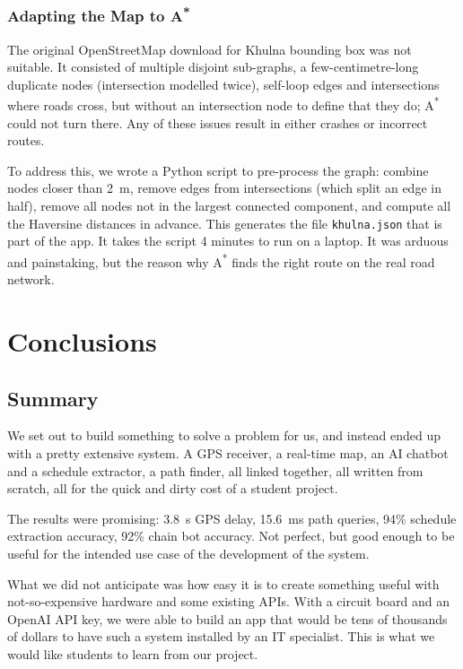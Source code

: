 \documentclass[12pt,a4paper]{report}
\begin{document}
\subsection*{Adapting the Map to A\textsuperscript{*}}

The original OpenStreetMap download for Khulna bounding box was not suitable. It consisted of multiple disjoint sub-graphs, a few-centimetre-long duplicate nodes (intersection modelled twice), self-loop edges and intersections where roads cross, but without an intersection node to define that they do; A\textsuperscript{*} could not turn there. Any of these issues result in either crashes or incorrect routes.

To address this, we wrote a Python script to pre-process the graph: combine nodes closer than 2~m, remove edges from intersections (which split an edge in half), remove all nodes not in the largest connected component, and compute all the Haversine distances in advance. This generates the file \texttt{khulna.json} that is part of the app. It takes the script 4 minutes to run on a laptop. It was arduous and painstaking, but the reason why A\textsuperscript{*} finds the right route on the real road network.

\chapter{Conclusions}

\section{Summary}

We set out to build something to solve a problem for us, and instead ended up with a pretty extensive system. A GPS receiver, a real-time map, an AI chatbot and a schedule extractor, a path finder, all linked together, all written from scratch, all for the quick and dirty cost of a student project.

The results were promising: 3.8~s GPS delay, 15.6~ms path queries, 94\% schedule extraction accuracy, 92\% chain bot accuracy. Not perfect, but good enough to be useful for the intended use case of the development of the system.

What we did not anticipate was how easy it is to create something useful with not-so-expensive hardware and some existing APIs. With a circuit board and an OpenAI API key, we were able to build an app that would be tens of thousands of dollars to have such a system installed by an IT specialist. This is what we would like students to learn from our project.
\end{document}
